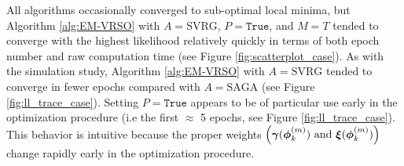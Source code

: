 %
All algorithms occasionally converged to sub-optimal local minima, but Algorithm \ref{alg:EM-VRSO} with $A = \text{SVRG}$, $P=\texttt{True}$, and $M=T$ tended to converge with the highest likelihood relatively quickly in terms of both epoch number and raw computation time (see Figure \ref{fig:scatterplot_case}). As with the simulation study, Algorithm \ref{alg:EM-VRSO} with $A = \text{SVRG}$ tended to converge in fewer epochs compared with $A=\text{SAGA}$ (see Figure \ref{fig:ll_trace_case}). Setting $P = \texttt{True}$ appears to be of particular use early in the optimization procedure (i.e the first $\approx$ 5 epochs, see Figure \ref{fig:ll_trace_case}). This behavior is intuitive because the proper weights $\left(\boldsymbol{\gamma}(\boldsymbol{\phi}_k^{(m)}) ~ \text{and} ~ \boldsymbol{\xi}(\boldsymbol{\phi}_k^{(m)})\right)$ change rapidly early in the optimization procedure. 